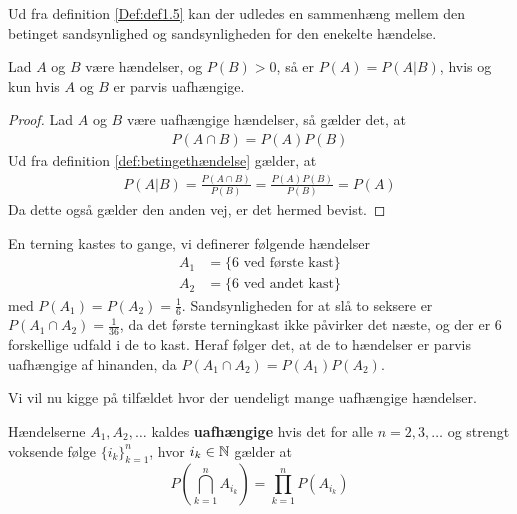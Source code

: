 Ud fra definition \ref{Def:def1.5} kan der udledes en sammenhæng mellem den betinget sandsynlighed og sandsynligheden for den enekelte hændelse. 
\begin{cor} %
    Lad $A$ og $B$ være hændelser, og $P(B) > 0$, så er $P(A)=P(A|B)$, hvis og kun hvis $A$ og $B$ er parvis uafhængige.   
\end{cor}
\begin{proof}
Lad $A$ og $B$ være uafhængige hændelser, så gælder det, at 
\begin{align*}
    P(A\cap B)=P(A)P(B)
\end{align*}
Ud fra definition \ref{def:betingethændelse} gælder, at 
\begin{align*}
    P(A|B)=\frac{P(A\cap B)}{P(B)}=\frac{P(A)P(B)}{P(B)}=P(A)
\end{align*}
Da dette også gælder den anden vej, er det hermed bevist.
\end{proof}

\begin{exmp} \label{exp:terning}
En terning kastes to gange, vi definerer følgende hændelser
\begin{align*}
  A_1 &=\{6 \text{ ved første kast}\} \\ A_2 &= \{6 \text{ ved andet kast}\} 
\end{align*}
med $P(A_1) = P(A_2) = \frac{1}{6}$. Sandsynligheden for at slå to seksere er $P(A_1 \cap A_2)=\frac{1}{36}$, da det første terningkast ikke påvirker det næste, og der er $6$ forskellige udfald i de to kast. Heraf følger det, at de to hændelser er parvis uafhængige af hinanden, da $P(A_1 \cap A_2) = P(A_1)P(A_2)$.
\end{exmp}

Vi vil nu kigge på tilfældet hvor der uendeligt mange uafhængige hændelser.
\begin{defn}
    Hændelserne $A_1, A_2, \ldots$ kaldes \textbf{uafhængige} hvis det for alle $n = 2, 3, \ldots$ og strengt voksende følge $\{i_k\}^n_{k = 1}$, hvor $i_k \in \mathbb{N}$ gælder at
    \begin{equation*}
        P\left(\bigcap_{k = 1}^n A_{i_k} \right) = \prod_{k = 1}^n P(A_{i_k})
    \end{equation*}
\end{defn}

%


